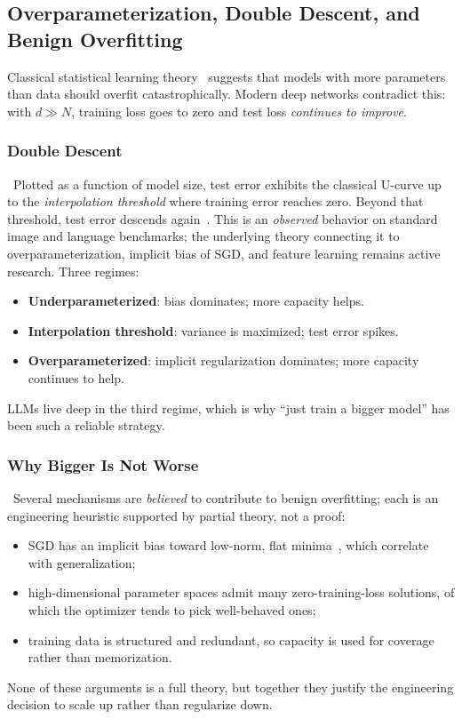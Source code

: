 \subsection{Overparameterization, Double Descent, and Benign Overfitting}

Classical statistical learning
theory~\citep{vapnik1998statistical,bishop2006prml} suggests that models
with more parameters than data should overfit catastrophically. Modern
deep networks contradict this: with $d \gg N$, training loss goes to
zero and test loss \emph{continues to improve}.

\subsubsection{Double Descent}

\Emp\ Plotted as a function of model size, test error exhibits the
classical U-curve up to the \emph{interpolation threshold} where
training error reaches zero. Beyond that threshold, test error
descends again~\citep{belkin2019reconciling,nakkiran2020double}. This
is an \emph{observed} behavior on standard image and language
benchmarks; the underlying theory connecting it to overparameterization,
implicit bias of SGD, and feature learning remains active research.
Three regimes:
\begin{itemize}
  \item \textbf{Underparameterized}: bias dominates; more capacity helps.
  \item \textbf{Interpolation threshold}: variance is maximized;
        test error spikes.
  \item \textbf{Overparameterized}: implicit regularization dominates;
        more capacity continues to help.
\end{itemize}
LLMs live deep in the third regime, which is why ``just train a bigger
model'' has been such a reliable strategy.

\subsubsection{Why Bigger Is Not Worse}

\Heur\ Several mechanisms are \emph{believed} to contribute to benign
overfitting; each is an engineering heuristic supported by partial
theory, not a proof:
\begin{itemize}
  \item SGD has an implicit bias toward low-norm, flat
        minima~\citep{keskar2017large}, which correlate with
        generalization;
  \item high-dimensional parameter spaces admit many zero-training-loss
        solutions, of which the optimizer tends to pick well-behaved
        ones;
  \item training data is structured and redundant, so capacity is used
        for coverage rather than memorization.
\end{itemize}
None of these arguments is a full theory, but together they justify the
engineering decision to scale up rather than regularize down.

